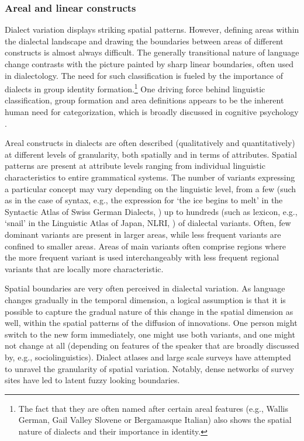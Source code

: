 \documentclass[output=paper]{langscibook}
\begin{document}
\subsubsection{Areal and linear constructs}
\begin{sloppypar}
Dialect variation displays striking spatial patterns. However, defining areas within the dialectal landscape and drawing the boundaries between areas of different constructs is almost always difficult. 
The generally transitional nature of language change contrasts with the picture painted by sharp linear boundaries, often used in dialectology.
The need for such classification is fueled by the importance of dialects in group identity formation.\footnote{The fact that they are often named after certain areal features (e.g., Wallis German, Gail Valley Slovene or Bergamasque Italian) also shows the spatial nature of dialects and their importance in identity.}
One driving force behind linguistic classification, group formation and area definitions appears to be the inherent human need for categorization, which is broadly discussed in cognitive psychology \parencite[for a cognitive linguist's overview, see][]{Lakoff1987}.
\end{sloppypar}


Areal constructs in dialects are often described (qualitatively and quantitatively) at different levels of granularity, both spatially and in terms of attributes. 
Spatial patterns are present at attribute levels ranging from individual linguistic characteristics to entire grammatical systems.
The number of variants expressing a particular concept may vary depending on the linguistic level, from a few (such as in the case of syntax, e.g., the expression for ‘the ice begins to melt' in  the Syntactic Atlas of Swiss German Dialects, \citet{Bucheli2002}) up to hundreds (such as lexicon, e.g., ‘snail' in the Linguistic Atlas of Japan, NLRI,  \citeyear{NLRI.}) of dialectal variants. Often, few dominant variants are present in larger areas, while less frequent variants are confined to smaller areas. Areas of main variants often comprise regions where the more frequent variant is used interchangeably with less frequent regional variants that are locally more characteristic.

Spatial boundaries are very often perceived in dialectal variation. 
As language changes gradually in the temporal dimension, a logical assumption is that it is possible to capture the gradual nature of this change in the spatial dimension as well, within the spatial patterns of the diffusion of innovations. One person might switch to the new form immediately, one might use both variants, and one might not change at all (depending on features of the speaker that are broadly discussed by, e.g., sociolinguistics).
Dialect atlases and large scale surveys have attempted to unravel the granularity of spatial variation. Notably, dense networks of survey sites have led to latent fuzzy looking boundaries.
\end{document}
